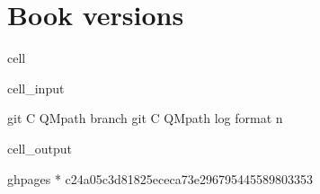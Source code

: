 \documentclass[letterpaper,table,10pt,english]{jupyterBook}
\begin{document}
\section{Book versions}
\label{\detokenize{tests/build_versions_checks:book-versions}}
\begin{sphinxuseclass}{cell}\begin{sphinxVerbatimInput}

\begin{sphinxuseclass}{cell_input}
\begin{sphinxVerbatim}[commandchars=\\\{\}]
  
git \PYGZhy{}C QMpath branch
git \PYGZhy{}C QMpath log \PYGZhy{}\PYGZhy{}format \PYGZhy{}n 
\end{sphinxVerbatim}

\end{sphinxuseclass}\end{sphinxVerbatimInput}
\begin{sphinxVerbatimOutput}

\begin{sphinxuseclass}{cell_output}
\begin{sphinxVerbatim}[commandchars=\\\{\}]
  gh\PYGZhy{}pages
* 
c24a05c3d81825ececa73e296795445589803353
\end{sphinxVerbatim}

\end{sphinxuseclass}\end{sphinxVerbatimOutput}

\end{sphinxuseclass}
\end{document}
